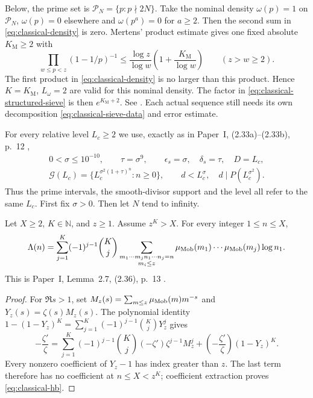 Below, the prime set is $\mathcal P_N=\{p:p\nmid2N\}$.
Take the nominal density $\omega(p)=1$ on $\mathcal P_N$,
$\omega(p)=0$ elsewhere and $\omega(p^a)=0$ for $a\ge2$. Then the
second sum in \eqref{eq:classical-density} is zero. Mertens' product
estimate gives one fixed absolute $K_{\mathrm M}\ge2$ with
\begin{equation}\label{eq:classical-mertens-density}
 \prod_{w\le p<z}(1-1/p)^{-1}
 \le\frac{\log z}{\log w}\left(1+\frac{K_{\mathrm M}}{\log w}\right)
 \qquad(z>w\ge2).
\end{equation}
The first product in \eqref{eq:classical-density} is no larger than this
product. Hence $K=K_{\mathrm M}$, $L_\omega=2$ are valid for
this nominal density. The factor in
\eqref{eq:classical-structured-sieve} is then $e^{K_{\mathrm M}+2}$.
See \cite[pp.~10--11]{PaperI}. Each actual sequence still needs
its own decomposition \eqref{eq:classical-sieve-data} and error estimate.

For every relative level $L_c\ge2$ we use, exactly as in Paper~I,
(2.33a)--(2.33b), p.~12 \cite[(2.33a)--(2.33b), p.~12]{PaperI},
\begin{equation}\label{eq:classical-relative-grid}
 \begin{gathered}
 0<\sigma\le10^{-10},\qquad \tau=\sigma^9,\qquad
 \epsilon_s=\sigma,\quad\delta_s=\tau,\quad D=L_c,\\
 \mathcal G(L_c)=\{L_c^{\sigma^2(1+\tau)^n}:n\ge0\},\qquad
 d<L_c^\sigma,\quad d\mid P(L_c^{\sigma^2}).
 \end{gathered}
\end{equation}
Thus the prime intervals, the smooth-divisor support and the level all
refer to the same $L_c$. First fix $\sigma>0$. Then let $N$ tend
to infinity.


\begin{fact}\label{fact:hb}
Let $X\ge2$, $K\in\mathbb N$, and $z\ge1$.
Assume $z^K>X$.
For every integer $1\le n\le X$,
\begin{equation}\label{eq:classical-hb}
 \Lambda(n)=\sum_{j=1}^{K}(-1)^{j-1}\binom Kj
 \sum_{\substack{m_1\cdots m_jn_1\cdots n_j=n\\m_i\le z}}
 \mu_{\rm Mob}(m_1)\cdots\mu_{\rm Mob}(m_j)\log n_1.
\end{equation}
This is Paper~I, Lemma~2.7, (2.36), p.~13
\cite[Lemma~2.7, (2.36), p.~13]{PaperI}.
\end{fact}

\begin{proof}
For $\Re s>1$, set $M_z(s)=\sum_{m\le z}\mu_{\rm Mob}(m)m^{-s}$
and $Y_z(s)=\zeta(s)M_z(s)$. The polynomial identity
$1-(1-Y_z)^K=\sum_{j=1}^K(-1)^{j-1}\binom KjY_z^j$ gives
\[
 -\frac{\zeta'}\zeta=
 \sum_{j=1}^K(-1)^{j-1}\binom Kj(-\zeta')\zeta^{j-1}M_z^j
 +\left(-\frac{\zeta'}\zeta\right)(1-Y_z)^K.
\]
Every nonzero coefficient of $Y_z-1$ has index greater than $z$.
The last term therefore has no coefficient at $n\le X<z^K$;
coefficient extraction proves \eqref{eq:classical-hb}.
\end{proof}

